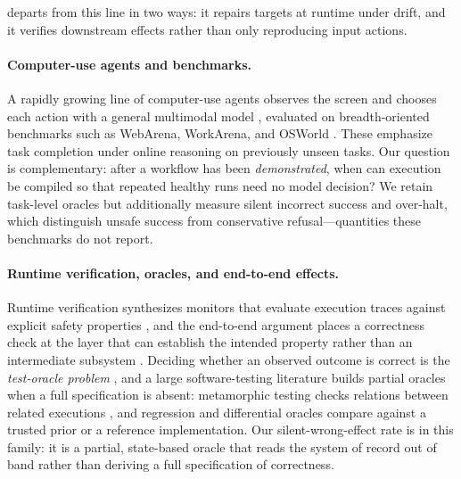 \system{} departs from this line in two ways: it repairs targets at runtime under
drift, and it verifies downstream effects rather than only reproducing input
actions.

\paragraph{Computer-use agents and benchmarks.}
A rapidly growing line of computer-use agents observes the screen and chooses
each action with a general multimodal model
\cite{anthropic2024computeruse,uitars2025,cheng2024seeclick}, evaluated on
breadth-oriented benchmarks such as WebArena, WorkArena, and OSWorld
\cite{webarena,workarena,osworld}. These emphasize task completion under online
reasoning on previously unseen tasks. Our question is complementary: after a
workflow has been \emph{demonstrated}, when can execution be compiled so that
repeated healthy runs need no model decision? We retain task-level oracles but
additionally measure silent incorrect success and over-halt, which distinguish
unsafe success from conservative refusal---quantities these benchmarks do not
report.

\paragraph{Runtime verification, oracles, and end-to-end effects.}
Runtime verification synthesizes monitors that evaluate execution traces
against explicit safety properties \cite{havelund2002synthesizing}, and the
end-to-end argument places a correctness check at the layer that can establish
the intended property rather than an intermediate subsystem \cite{saltzer1984end}.
Deciding whether an observed outcome is correct is the \emph{test-oracle problem}
\cite{barr2015oracle}, and a large software-testing literature builds partial
oracles when a full specification is absent: metamorphic testing checks relations
between related executions \cite{chen2018metamorphic}, and regression and
differential oracles compare against a trusted prior or a reference
implementation. Our silent-wrong-effect rate is in this family: it is a partial,
state-based oracle that reads the system of record out of band rather than
deriving a full specification of correctness.

